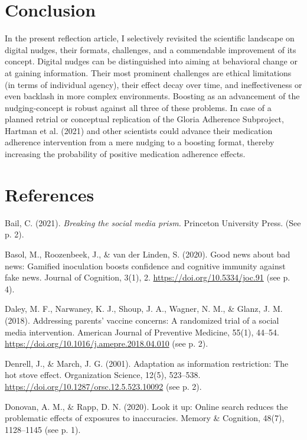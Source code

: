 \documentclass[reflection, authordate,issue]{jote-new-article}
\begin{document}
\section{Conclusion}



In the present reflection article, I selectively revisited the scientific landscape on digital nudges, their formats, challenges, and a commendable improvement of its concept. Digital nudges can be distinguished into aiming at behavioral change or at gaining information. Their most prominent challenges are ethical limitations (in terms of individual agency), their effect decay over time, and ineffectiveness or even backlash in more complex environments. Boosting as an advancement of the nudging-concept is robust against all three of these problems. In case of a planned retrial or conceptual replication of the Gloria Adherence Subproject, Hartman et al. (2021) and other scientists could advance their medication adherence intervention from a mere nudging to a boosting format, thereby increasing the probability of positive medication adherence effects.


\section{References}


Bail, C. (2021). \emph{Breaking the social media prism.} Princeton University Press. (See p. 2).

Basol, M., Roozenbeek, J., \& van der Linden, S. (2020). Good news about bad news: Gamified inoculation boosts confidence and cognitive immunity
against fake news. Journal of Cognition, 3(1), 2. \url{https://doi.org/10.5334/joc.91} (see p. 4).

Daley, M. F., Narwaney, K. J., Shoup, J. A., Wagner, N. M., \& Glanz, J. M. (2018). Addressing parents’ vaccine concerns: A randomized trial of a social
media intervention. American Journal of Preventive Medicine, 55(1), 44–54. \url{https://doi.org/10.1016/j.amepre.2018.04.010} (see p. 2).

Denrell, J., \& March, J. G. (2001). Adaptation as information restriction: The hot stove effect. Organization Science, 12(5), 523–538. \url{https://doi.org/10.1287/orsc.12.5.523.10092} (see p. 2).

Donovan, A. M., \& Rapp, D. N. (2020). Look it up: Online search reduces the problematic effects of exposures to inaccuracies. Memory \& Cognition, 48(7), 1128–1145 (see p. 1).
\end{document}
